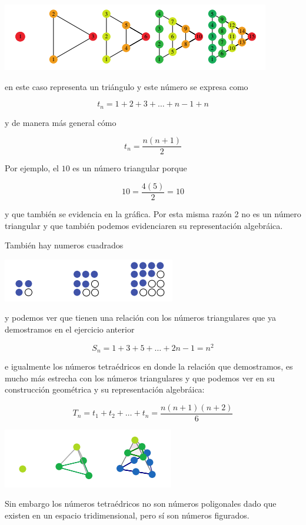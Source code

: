 \documentclass{article}
\begin{document}
\begin{center}
    \includegraphics[scale=0.8]{example}
\end{center}

en este caso representa un triángulo y este número se expresa como

$$t_n = 1 + 2 + 3 + \dots + n-1 + n$$

y de manera más general cómo

$$t_n = \frac{n(n+1)}{2}$$

Por ejemplo, el $10$ es un número triangular porque

$$10 = \frac{4(5)}{2} = 10$$

y que también se evidencia en la gráfica. Por esta misma razón 2 no es un número triangular y que también podemos evidenciaren su representación algebráica.

También hay numeros cuadrados

\begin{center}
    \includegraphics[scale=0.8]{squared}
\end{center}

y podemos ver que tienen una relación con los números triangulares que ya demostramos en el ejercicio anterior

\begin{equation*}
	S_n = 1 + 3 +5 + \dots + 2n - 1 = n^2 
\end{equation*}

e igualmente los números tetraédricos en donde la relación que demostramos, es mucho más estrecha con los números triangulares y que podemos ver en su construcción geométrica y su representación algebráica:

\begin{equation*}
	T_n = t_1 + t_2 + \dots + t_n = \frac{n(n+1)(n+2)}{6}
\end{equation*}

\begin{center}
    \includegraphics[scale=0.8]{tetraedricos}
\end{center}

Sin embargo los números tetraédricos no son números poligonales dado que existen en un espacio tridimensional, pero sí son números figurados.

\nocite{*}



\end{document}

